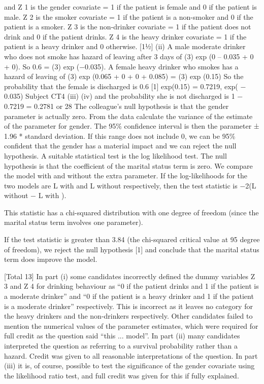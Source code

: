 \documentclass[a4paper,12pt]{article}
\begin{document}
and
Z 1 is the gender covariate = 1 if the patient is female and 0 if the patient is male.
Z 2 is the smoker covariate = 1 if the patient is a non-smoker and 0 if the patient is a
smoker.
Z 3 is the non-drinker covariate = 1 if the patient does not drink and 0 if the patient
drinks.
Z 4 is the heavy drinker covariate = 1 if the patient is a heavy drinker and 0 otherwise.
[11⁄2]
(ii)
A male moderate drinker who does not smoke has hazard of leaving after 3 days of
 (3) exp (0 – 0.035 + 0 + 0). 
So 0.6 =  (3) exp (−0.035). 
A female heavy drinker who smokes has a hazard of leaving of
 (3) exp (0.065 + 0 + 0 + 0.085) =  (3) exp (0.15)
So the probability that the female is discharged is 0.6
[1]
exp(0.15)
= 0.7219,
exp( − 0.035)
Subject CT4 %
(iii)
(iv)
and the probability she is not discharged is 1 − 0.7219 = 0.2781 or 28%
The colleague’s null hypothesis is that the gender parameter is actually zero. 
From the data calculate the variance of the estimate of the parameter for gender. 
The 95\% confidence interval is then the parameter ± 1.96 * standard deviation. 
If this range does not include 0, we can be 95\% confident that the gender has a
material impact and we can reject the null hypothesis. 
A suitable statistical test is the log likelihood test. 
The null hypothesis is that the coefficient of the marital status term is zero. 
We compare the model with and without the extra parameter. 
If the log-likelihoods for the two models are L with and L without respectively, then the
test statistic is −2(L without − L with ).

This statistic has a chi-squared distribution with one degree of freedom (since the
marital status term involves one parameter).

If the test statistic is greater than 3.84 (the chi-squared critical value at 95%
degree of freedom), we reject the null hypothesis
[1]
and conclude that the marital status term does improve the model.
\newpage

[Total 13]
In part (i) some candidates incorrectly defined the dummy variables Z 3 and Z 4
for drinking behaviour as “0 if the patient drinks and 1 if the patient is a
moderate drinker” and “0 if the patient is a heavy drinker and 1 if the patient is
a moderate drinker” respectively. This is incorrect as it leaves no category for
the heavy drinkers and the non-drinkers respectively. Other candidates failed
to mention the numerical values of the parameter estimates, which were
required for full credit as the question said “this ... model”. In part (ii) many
candidates interpreted the question as referring to a survival probability rather
than a hazard. Credit was given to all reasonable interpretations of the
question. In part (iii) it is, of course, possible to test the significance of the
gender covariate using the likelihood ratio test, and full credit was given for
this if fully explained.
\end{document}
